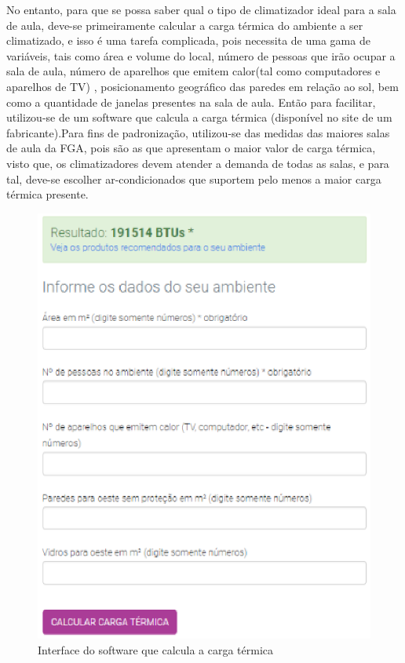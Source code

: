 No entanto, para que se possa saber qual o tipo de climatizador ideal para a sala de aula, deve-se primeiramente calcular a carga térmica do ambiente a ser climatizado, e isso é uma tarefa complicada, pois necessita de uma gama de variáveis, tais como área e volume do local, número de pessoas que irão ocupar a sala de aula, número de aparelhos que emitem calor(tal como computadores e aparelhos de TV) , posicionamento geográfico das paredes em relação ao sol, bem como a quantidade de janelas presentes na sala de aula.
Então para facilitar, utilizou-se de um software que calcula a carga térmica (disponível no site de um fabricante).Para fins de padronização, utilizou-se das medidas das maiores salas de aula da FGA, pois são as que apresentam o maior valor de carga térmica, visto que, os climatizadores devem atender a demanda de todas as salas, e para tal, deve-se escolher ar-condicionados que suportem pelo menos a maior carga térmica presente.

\begin{figure}[!ht]
  \centering
  \includegraphics[keepaspectratio=true,scale=1]{figuras/interface_calculo_carga_termica.eps}
  \caption{Interface do software que calcula a carga térmica}
  \label{fig:calculo_carga_termica}
\end{figure}

